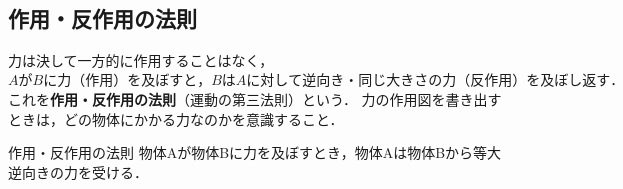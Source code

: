 \ 
 
%
%
\newpage
\subsection{作用・反作用の法則}

力は決して一方的に作用することはなく，$AがBに力（作用）を及ぼすと，BはAに対して逆向き・同じ大きさの力（反作用）を及ぼし返す．$これを{\bf 作用・反作用の法則}（運動の第三法則）という．
力の作用図を書き出すときは，どの物体にかかる力なのかを意識すること．

\begin{matome}{作用・反作用の法則}
 \hspace{5mm} 物体Aが物体Bに力を及ぼすとき，物体Aは物体Bから等大逆向きの力を受ける．
 \end{matome}

 \ 
% 
%

